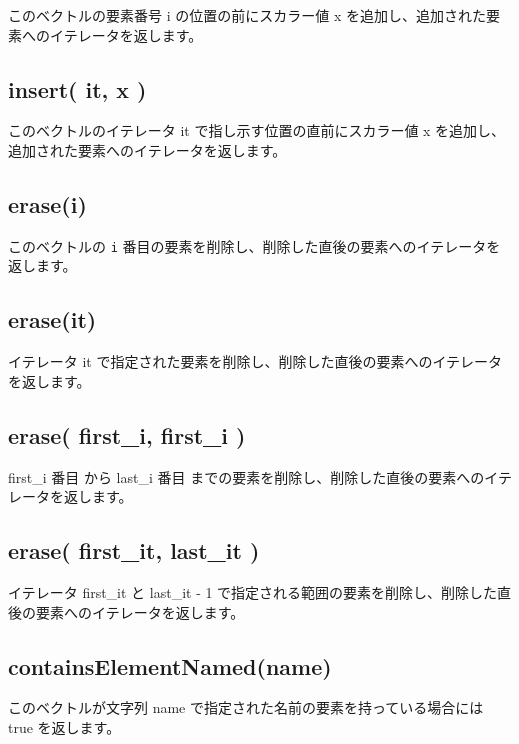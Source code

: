 \documentclass[]{book}
\begin{document}
このベクトルの要素番号 i の位置の前にスカラー値 x を追加し、追加された要素へのイテレータを返します。

\hypertarget{insert-it-x}{%
\subsection{insert( it, x )}\label{insert-it-x}}

このベクトルのイテレータ it で指し示す位置の直前にスカラー値 x を追加し、追加された要素へのイテレータを返します。

\hypertarget{erasei}{%
\subsection{erase(i)}\label{erasei}}

このベクトルの \texttt{i} 番目の要素を削除し、削除した直後の要素へのイテレータを返します。

\hypertarget{eraseit}{%
\subsection{erase(it)}\label{eraseit}}

イテレータ it で指定された要素を削除し、削除した直後の要素へのイテレータを返します。

\hypertarget{erase-first_i-first_i}{%
\subsection{erase( first\_i, first\_i )}\label{erase-first_i-first_i}}

first\_i 番目 から last\_i 番目 までの要素を削除し、削除した直後の要素へのイテレータを返します。

\hypertarget{erase-first_it-last_it}{%
\subsection{erase( first\_it, last\_it )}\label{erase-first_it-last_it}}

イテレータ first\_it と last\_it - 1 で指定される範囲の要素を削除し、削除した直後の要素へのイテレータを返します。

\hypertarget{containselementnamedname}{%
\subsection{containsElementNamed(name)}\label{containselementnamedname}}

このベクトルが文字列 name で指定された名前の要素を持っている場合には true を返します。
\end{document}
